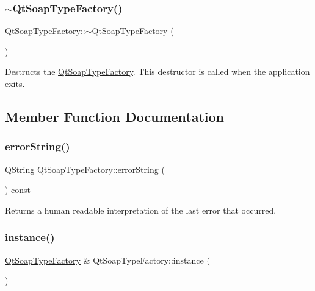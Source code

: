 \subsubsection{\texorpdfstring{$\sim$\+Qt\+Soap\+Type\+Factory()}{~QtSoapTypeFactory()}}
{\footnotesize\ttfamily Qt\+Soap\+Type\+Factory\+::$\sim$\+Qt\+Soap\+Type\+Factory (\begin{DoxyParamCaption}{ }\end{DoxyParamCaption})}

Destructs the \mbox{\hyperlink{class_qt_soap_type_factory}{Qt\+Soap\+Type\+Factory}}. This destructor is called when the application exits. 

\subsection{Member Function Documentation}
\mbox{\label{class_qt_soap_type_factory_a95e46dc6e31a67ac8dc5a13607b0bce6}} 
\subsubsection{\texorpdfstring{error\+String()}{errorString()}}
{\footnotesize\ttfamily Q\+String Qt\+Soap\+Type\+Factory\+::error\+String (\begin{DoxyParamCaption}{ }\end{DoxyParamCaption}) const}

Returns a human readable interpretation of the last error that occurred. \mbox{\label{class_qt_soap_type_factory_a193edc044465683f13bef6193fb9d33e}} 
\subsubsection{\texorpdfstring{instance()}{instance()}}
{\footnotesize\ttfamily \mbox{\hyperlink{class_qt_soap_type_factory}{Qt\+Soap\+Type\+Factory}} \& Qt\+Soap\+Type\+Factory\+::instance (\begin{DoxyParamCaption}{ }\end{DoxyParamCaption})\hspace{0.3cm}{\ttfamily [static]}}

